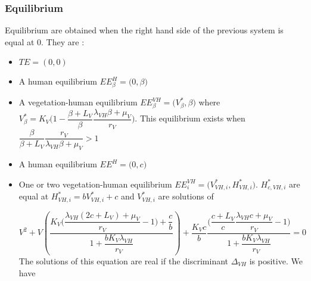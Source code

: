 \documentclass{article}
\newcommand{\lv}{\lambda_{VH}}
\begin{document}
\subsubsection{Equilibrium}
Equilibrium are obtained when the right hand side of the previous system is equal at 0. They are :
\begin{itemize}
\item $TE = (0,0)$
\item A human equilibrium $EE^H_\beta = \Big(0,\beta \Big)$
\item A vegetation-human equilibrium $EE^{VH}_\beta = \Big(V^*_{\beta}, \beta \Big)$ where $V^*_\beta = K_V \Big(1- \dfrac{\beta + L_V}{\beta} \dfrac{\lv \beta + \mu_V}{r_V} \Big)$. This equilibrium exists when $\dfrac{\beta}{\beta + L_V} \dfrac{r_V}{\lv \beta + \mu_V} > 1$
\item A human equilibrium $EE^H = \Big(0,c\Big)$
\item One or two vegetation-human equilibrium $EE^{VH}_i = \Big(V^*_{VH,i}, H^*_{VH,i} \Big)$. $H^*_{c, VH,i}$ are equal at $H^*_{VH, i} = bV^*_{VH, i} + c$ and $V^*_{VH,i}$ are solutions of
%
%

\begin{equation}
V^2 + V \left(\dfrac{K_V\Big(\dfrac{\lv(2c+L_V) + \mu_V}{r_V} - 1\Big) + \dfrac{c}{b}}{1 + \dfrac{b K_V \lv}{r_V}}  \right) + \dfrac{K_Vc}{b} \dfrac{\Big(\dfrac{c+L_V}{c} \dfrac{\lv c + \mu_V}{r_V} - 1\Big)}{1 + \dfrac{b K_V \lv}{r_V}} = 0
\label{equilibreVH:equationV}
\end{equation}
The solutions of this equation are real if the discriminant $\Delta_{VH}$ is positive. We have


\end{itemize}
\end{document}
